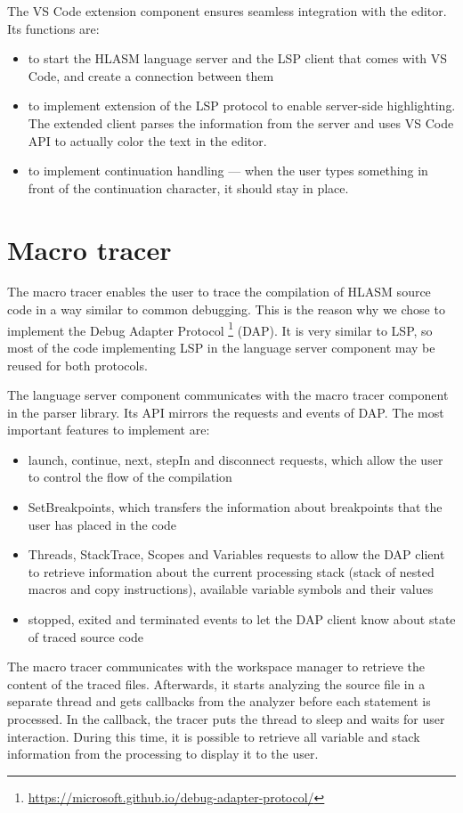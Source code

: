 The VS Code extension component ensures seamless integration with the editor. Its functions are:

\begin{itemize}
	\item to start the HLASM language server and the LSP client that comes with VS Code, and create a connection between them
	\item to implement extension of the LSP protocol to enable server-side highlighting. The extended client parses the information from the server and uses VS Code API to actually color the text in the editor.
	\item to implement continuation handling --- when the user types something in front of the continuation character, it should stay in place.
\end{itemize}


\section{Macro tracer}
\label{arch:macro}
The macro tracer enables the user to trace the compilation of HLASM source code in a way similar to common debugging. This is the reason why we chose to implement the Debug Adapter Protocol \footnote{\url{https://microsoft.github.io/debug-adapter-protocol/}} (DAP). It is very similar to LSP, so most of the code implementing LSP in the language server component may be reused for both protocols.

The language server component communicates with the macro tracer component in the parser library. Its API mirrors the requests and events of DAP. The most important features to implement are:

\begin{itemize}
	\item launch, continue, next, stepIn and disconnect requests, which allow the user to control the flow of the compilation
	\item SetBreakpoints, which transfers the information about breakpoints that the user has placed in the code
	\item Threads, StackTrace, Scopes and Variables requests to allow the DAP client to retrieve information about the current processing stack (stack of nested macros and copy instructions), available variable symbols and their values
	\item stopped, exited and terminated events to let the DAP client know about state of traced source code
\end{itemize}

The macro tracer communicates with the workspace manager to retrieve the content of the traced files. Afterwards, it starts analyzing the source file in a separate thread and gets callbacks from the analyzer before each statement is processed. In the callback, the tracer puts the thread to sleep and waits for user interaction. During this time, it is possible to retrieve all variable and stack information from the processing to display it to the user.
